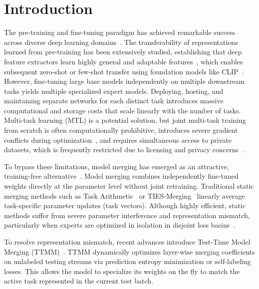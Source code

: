 \documentclass{article}
\theoremstyle{plain}
\theoremstyle{definition}
\theoremstyle{remark}
\begin{document}
\printAffiliationsAndNotice{\icmlEqualContribution}

\section{Introduction}
\label{sec:intro}
The pre-training and fine-tuning paradigm has achieved remarkable success across diverse deep learning domains~\cite{vaswani2017attention, devlin2018bert, he2016deep, dosovitskiy2020image}. The transferability of representations learned from pre-training has been extensively studied, establishing that deep feature extractors learn highly general and adaptable features~\cite{bengio2013representation, yosinski2014transferable, pan2009survey}, which enables subsequent zero-shot or few-shot transfer using foundation models like CLIP~\cite{radford2021learning}. However, fine-tuning large base models independently on multiple downstream tasks yields multiple specialized expert models. Deploying, hosting, and maintaining separate networks for each distinct task introduces massive computational and storage costs that scale linearly with the number of tasks. Multi-task learning (MTL) is a potential solution, but joint multi-task training from scratch is often computationally prohibitive, introduces severe gradient conflicts during optimization~\cite{yu2020gradient, sener2018multi}, and requires simultaneous access to private datasets, which is frequently restricted due to licensing and privacy concerns~\cite{zhang2022survey, caruana1997multitask}.

To bypass these limitations, model merging has emerged as an attractive, training-free alternative~\cite{wortsman2022robust, matena2021merging, ilharco2022editing}. Model merging combines independently fine-tuned weights directly at the parameter level without joint retraining. Traditional static merging methods such as Task Arithmetic~\cite{ilharco2022editing} or TIES-Merging~\cite{yadav2023resolving} linearly average task-specific parameter updates (task vectors). Although highly efficient, static methods suffer from severe parameter interference and representation mismatch, particularly when experts are optimized in isolation in disjoint loss basins~\cite{ainsworth2022git, stoica2023zip}.

To resolve representation mismatch, recent advances introduce Test-Time Model Merging (TTMM)~\cite{zhao2024dynamic, li2024test}. TTMM dynamically optimizes layer-wise merging coefficients on unlabeled testing streams via prediction entropy minimization or self-labeling losses. This allows the model to specialize its weights on the fly to match the active task represented in the current test batch.
\end{document}
